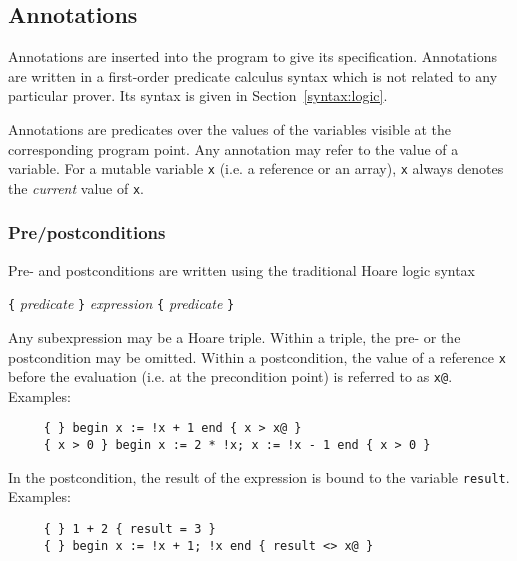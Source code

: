 \documentclass[a4paper,12pt]{report}
\makeatletter
\newcommand{\indextt}[1]{\index{#1@\texttt{#1}}}
\makeatother
\begin{document}
\subsection{Annotations}
\label{annotations}

Annotations are inserted into the program to give its specification.
Annotations are written in a first-order predicate calculus syntax
which is not related to any particular prover. Its syntax is given in
Section~\ref{syntax:logic}. 

Annotations are predicates over the values of the variables
visible at the corresponding program point.
Any annotation may refer to the value of a variable.  For a mutable
variable \texttt{x} (i.e. a reference or an array), \texttt{x} always 
denotes the \emph{current} value of \texttt{x}.

\subsubsection{Pre/postconditions}
Pre- and postconditions are written using the traditional Hoare logic
syntax 
\begin{center}
  \texttt{\{} \textsl{predicate} \texttt{\}} 
  \textsl{expression}
  \texttt{\{} \textsl{predicate} \texttt{\}} 
\end{center}
Any subexpression may be a Hoare triple. Within a triple, the pre- or
the postcondition may be omitted.
Within a postcondition, the value of a reference \texttt{x} before the
evaluation (i.e. at the precondition point) is referred to as \texttt{x@}.
Examples:
\begin{verbatim}
     { } begin x := !x + 1 end { x > x@ }
     { x > 0 } begin x := 2 * !x; x := !x - 1 end { x > 0 }
\end{verbatim}
In the postcondition, the result of the expression is bound to the
variable \texttt{result}. \indextt{result} 
Examples:
\begin{verbatim}
     { } 1 + 2 { result = 3 }
     { } begin x := !x + 1; !x end { result <> x@ }
\end{verbatim}
\end{document}
